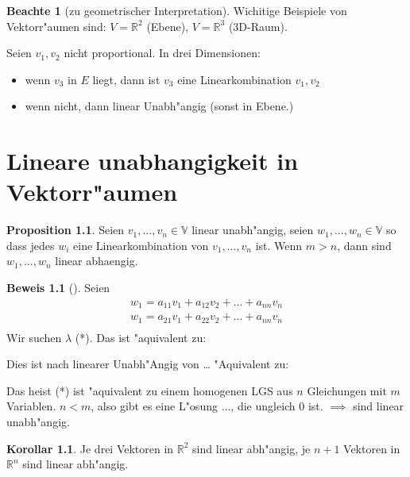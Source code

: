 \documentclass[oneside,fontsize=11pt,paper=a4,BCOR=0mm,DIV=12,automark,headsepline]{scrbook}
\theoremstyle{remark}
\theoremstyle{definition}
\newtheorem*{notte}{Beachte}
\newtheorem*{proposition}{Proposition}
\newtheorem*{korollar}{Korollar}
\theoremstyle{definition}
\newtheorem*{prof}{Beweis}
\theoremstyle{remark}
\begin{document}
\begin{notte}[zu geometrischer Interpretation]
  Wichitige Beispiele von Vektorr"aumen sind: \(V=\mathbb{R}^2\) (Ebene),
  \(V=\mathbb{R}^3\) (3D-Raum).
\end{notte}

Seien \(v_1, v_2\) nicht proportional.
In drei Dimensionen:
\begin{relation}
  \begin{itemize}
  \item wenn \(v_3\) in \(E\) liegt, dann ist \(v_3\) eine Linearkombination \(v_1, v_2\)
  \item wenn nicht, dann linear Unabh"angig (sonst in Ebene.)
  \end{itemize}
\end{relation}

\chapter{Lineare unabhangigkeit in Vektorr"aumen}
\label{sec:orgea5b4b9}
\begin{proposition}
  Seien \(v_1,...,v_n \in \mathbb{V}\) linear unabh"angig, seien \(w_1,
  ..., w_n \in \mathbb{V}\) so dass jedes \(w_i\) eine Linearkombination von
  \(v_1,...,v_n\) ist. Wenn \(m>n\), dann sind \(w_1,...,w_n\) linear abhaengig.
\end{proposition}

\begin{prof}[]
  Seien 
  \begin{align*}
    w_1= a_{11} v_1 + a_{12} v_2 + ... + a_{nn} v_n \\
    w_1= a_{21} v_1 + a_{22} v_2 + ... + a_{nn} v_n \\
  \end{align*}
  Wir suchen \(\lambda\) (*). Das ist "aquivalent zu:

  Dies ist nach linearer Unabh"Angig von \ldots{} "Aquivalent zu:

  Das heist (*) ist "aquivalent zu einem homogenen LGS aus \(n\) Gleichungen mit \(m\)
  Variablen. \(n<m\), also gibt es eine L"osung $\ldots{}$, die ungleich \(0\) ist. \(\implies\)
  sind linear unabh"angig.
\end{prof}

\begin{korollar}
  Je drei Vektoren in \(\mathbb{R}^2\) sind linear abh"angig, je \(n+1\)
  Vektoren in $\mathbb{R}^n$ sind linear abh"angig.
\end{korollar}
\end{document}
